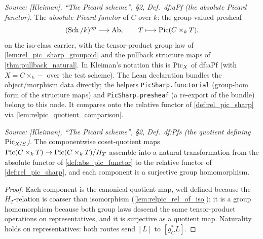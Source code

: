 \begin{definition}\leanok
  \label{def:abs_pic_functor}
  \textit{Source: [Kleiman], ``The Picard scheme'', \S 2, Def.~df:aPf
  (the absolute Picard functor).}
  The \emph{absolute Picard functor} of \(C\) over \(k\): the group-valued
  presheaf
  \[
    (\operatorname{Sch}/k)^{op} \longrightarrow \mathrm{Ab}, \qquad
    T \longmapsto \operatorname{Pic}(C \times_k T),
  \]
  on the iso-class carrier, with the tensor-product group law of
  \cref{lem:rel_pic_sharp_groupoid} and the pullback structure maps of
  \cref{thm:pullback_natural}. In Kleiman's notation this is \(\operatorname{Pic}_X\)
  of df:aPf (with \(X = C \times_k -\) over the test scheme). The Lean
  declaration bundles the object/morphism data directly; the helpers
  \texttt{PicSharp.functorial} (group-hom form of the structure maps) and
  \texttt{PicSharp.presheaf} (a re-export of the bundle) belong to this
  node. It compares onto the relative functor of \cref{def:rel_pic_sharp}
  via \cref{lem:relpic_quotient_comparison}.
\end{definition}

\begin{lemma}\leanok
  \label{lem:relpic_quotient_comparison}
  \textit{Source: [Kleiman], ``The Picard scheme'', \S 2, Def.~df:Pfs
  (the quotient defining \(\operatorname{Pic}_{X/S}\)).}
  The componentwise coset-quotient maps
  \(\operatorname{Pic}(C \times_k T) \to \operatorname{Pic}(C \times_k T)/H_T\) assemble into a natural
  transformation from the absolute functor of \cref{def:abs_pic_functor} to
  the relative functor of \cref{def:rel_pic_sharp}, and each
  component is a surjective group homomorphism.
\end{lemma}

\begin{proof}\leanok
  Each component is the canonical quotient map, well defined because the
  \(H_T\)-relation is coarser than isomorphism
  (\cref{lem:relpic_rel_of_iso}); it is a group homomorphism because both
  group laws descend the same tensor-product operations on representatives,
  and it is surjective as a quotient map. Naturality holds on
  representatives: both routes send \([L]\) to \([g_C^* L]\).
\end{proof}

